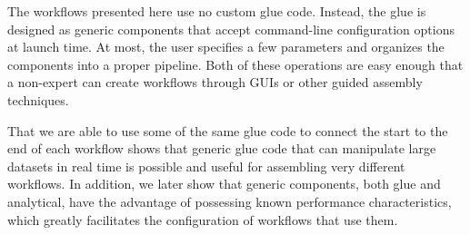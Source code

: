 The workflows presented here use no custom glue code. Instead, the glue is
designed as generic components that accept command-line configuration options
at launch time. At most, the user specifies a few parameters and organizes
the components into a proper pipeline. Both of these operations are easy enough
that a non-expert
can create workflows through GUIs or other guided assembly techniques.

That we are able to use some of the same glue code to connect the start to the
end of each workflow shows that generic glue code that can manipulate large
datasets in real time is possible and useful for assembling very different
workflows.  In addition, we later show that generic components, both glue and
analytical, have the advantage of possessing known performance characteristics,
which greatly facilitates the configuration of workflows that use them.
\fi

